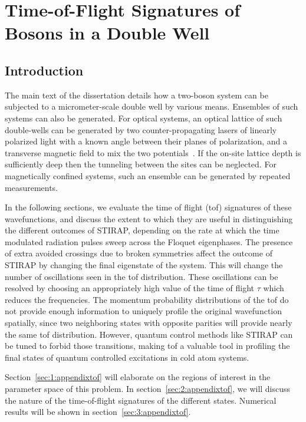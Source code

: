 \chapter{Time-of-Flight Signatures of Bosons in a Double Well}
%
\label{appendix-tof}
%
\section{Introduction}
The main text of the dissertation details how a two-boson system can be subjected to a micrometer-scale double well by various means. Ensembles of such systems can also be generated. For optical systems, an optical lattice of such double-wells can be generated by two counter-propagating lasers of linearly polarized light with a known angle between their planes of polarization, and a transverse magnetic field to mix the two potentials~\cite{Deutsch:Jessen}. If the on-site lattice depth is sufficiently deep then the tunneling between the sites can be neglected. For magnetically confined systems, such an ensemble can be generated by repeated measurements.

In the following sections, we evaluate the time of flight (tof) signatures of these wavefunctions, and discuss the extent to which they are useful in distinguishing the different outcomes of STIRAP, depending on the rate at which the time modulated radiation pulses sweep across the Floquet eigenphases. The presence of extra avoided crossings due to broken symmetries affect the outcome of STIRAP by changing the final eigenstate of the system. This will change the number of oscillations seen in the tof distribution. These oscillations can be resolved by choosing an appropriately high value of the time of flight $\tau$ which reduces the frequencies. The momentum probability distributions of the tof do not provide enough information to uniquely profile the original wavefunction spatially, since two neighboring states with opposite parities will provide nearly the same tof distribution. However, quantum control methods like STIRAP can be tuned to forbid those transitions, making tof a valuable tool in profiling the final states of quantum controlled excitations in cold atom systems. 

Section~\ref{sec:1:appendixtof} will elaborate on the regions of interest in the parameter space of this problem. In section~\ref{sec:2:appendixtof}, we will discuss the nature of the time-of-flight signatures of the different states. Numerical results will be shown in section~\ref{sec:3:appendixtof}. 


